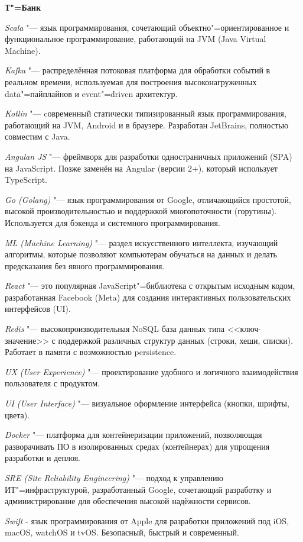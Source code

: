 \documentclass{article}
\begin{document}
\begin{center}
    \textbf{Т"=Банк}
\end{center}

\textit{Scala} "--- язык программирования, сочетающий объектно"=ориентированное и функциональное программирование, работающий на JVM (Java Virtual Machine).

\textit{Kafka} "--- распределённая потоковая платформа для обработки событий в реальном времени, используемая для построения высоконагруженных data"=пайплайнов и event"=driven архитектур.

\textit{Kotlin} "--- cовременный статически типизированный язык программирования, работающий на JVM, Android и в браузере. Разработан JetBrains, полностью совместим с Java. 

\textit{Angulan JS} "--- фреймворк для разработки одностраничных приложений (SPA) на JavaScript. Позже заменён на Angular (версии 2+), который использует TypeScript.

\textit{Go (Golang)} "--- язык программирования от Google, отличающийся простотой, высокой производительностью и поддержкой многопоточности (горутины). Используется для бэкенда и системного программирования.

\textit{ML (Machine Learning)} "--- раздел искусственного интеллекта, изучающий алгоритмы, которые позволяют компьютерам обучаться на данных и делать предсказания без явного программирования.

\textit{React} "--- это популярная JavaScript"=библиотека с открытым исходным кодом, разработанная Facebook (Meta) для создания интерактивных пользовательских интерфейсов (UI).

\textit{Redis} "--- высокопроизводительная NoSQL база данных типа <<ключ-значение>> с поддержкой различных структур данных (строки, хеши, списки). Работает в памяти с возможностью persistence.

\textit{UX (User Experience)} "--- проектирование удобного и логичного взаимодействия пользователя с продуктом.

\textit{UI (User Interface)} "--- визуальное оформление интерфейса (кнопки, шрифты, цвета).

\textit{Docker} "--- платформа для контейнеризации приложений, позволяющая разворачивать ПО в изолированных средах (контейнерах) для упрощения разработки и деплоя.

\textit{SRE (Site Reliability Engineering)} "--- подход к управлению ИТ"=инфраструктурой, разработанный Google, сочетающий разработку и администрирование для обеспечения высокой надёжности сервисов.

\textit{Swift} - язык программирования от Apple для разработки приложений под iOS, macOS, watchOS и tvOS. Безопасный, быстрый и современный.
\end{document}
